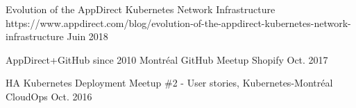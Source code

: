 

\begin{cvhonors}

  \cvhonor
    {Evolution of the AppDirect Kubernetes Network Infrastructure} %
    {https://www.appdirect.com/blog/evolution-of-the-appdirect-kubernetes-network-infrastructure} %
    {} %
    {Juin 2018} %

\end{cvhonors}


\begin{cvhonors}

  \cvhonor
    {AppDirect+GitHub since 2010} %
    {Montréal GitHub Meetup} %
    {Shopify} %
    {Oct. 2017} %

  \cvhonor
    {HA Kubernetes Deployment} %
    {Meetup \#2 - User stories, Kubernetes-Montréal} %
    {CloudOps} %
    {Oct. 2016} %

\end{cvhonors}